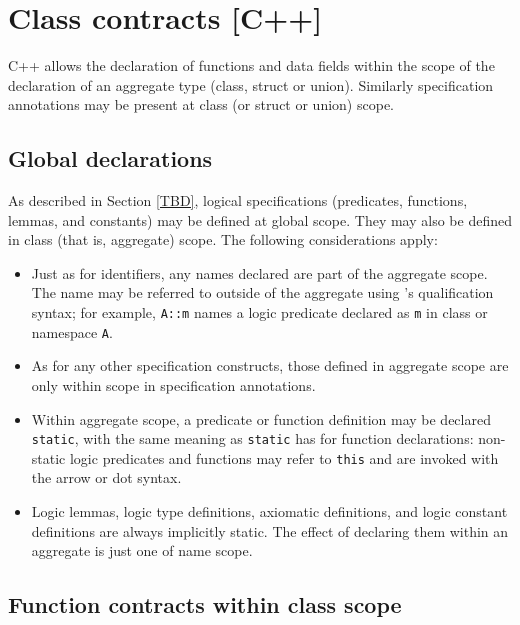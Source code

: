 \section{Class contracts [C++]}
\label{sec:class-contracts}

C++ allows the declaration of functions and data fields within
the scope of the declaration of an aggregate type (class, struct or union). Similarly \NAME{} specification annotations
may be present at class (or struct or union) scope.

\subsection{Global declarations}

As described in Section \ref{TBD}, logical specifications (predicates, functions, lemmas, and constants) may be defined at global scope. They may also be defined in class (that is, aggregate) scope. The following considerations apply:
\begin{itemize}
	\item Just as for \lang{} identifiers, any names 
	declared are part of the aggregate scope. The name may
	be referred to outside of the aggregate using \lang's 
	qualification syntax; for example, \lstinline|A::m| names a 
	logic predicate declared as \lstinline|m| in class
	or namespace \lstinline|A|.
	\item As for any other specification constructs, those defined in aggregate scope are only within scope in  specification annotations.
	\item Within aggregate scope, a predicate or function definition may be
	declared \lstinline|static|, with the same meaning as 
	\lstinline|static| has for \lang{} function 
	declarations: non-static logic predicates and functions
	may refer to \lstinline|this| and are invoked with the
	\lang{} arrow or dot syntax.

	\item Logic lemmas, logic type definitions, axiomatic definitions, and logic constant definitions are always implicitly static. The effect of declaring them within an aggregate is just one of name scope.
\end{itemize}



\subsection{Function contracts within class scope}


